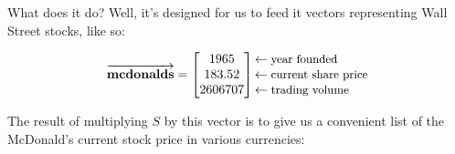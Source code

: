 What does it do? Well, it's designed for us to feed it vectors representing
Wall Street stocks, like so:

\vspace{-.3in} 
\begin{align*}
\overrightarrow{\textbf{mcdonalds}} =
\begin{bmatrix}
1965 \\ 183.52 \\ 2606707 \\
\end{bmatrix}
\begin{matrix*}[l]
\leftarrow\textrm{\small{year founded}} \\
\leftarrow\textrm{\small{current share price}} \\
\leftarrow\textrm{\small{trading volume}} \\
\end{matrix*}
\end{align*}
\vspace{-.15in}

The result of multiplying $S$ by this vector is to give us a convenient list of
the McDonald's current stock price in various currencies:

